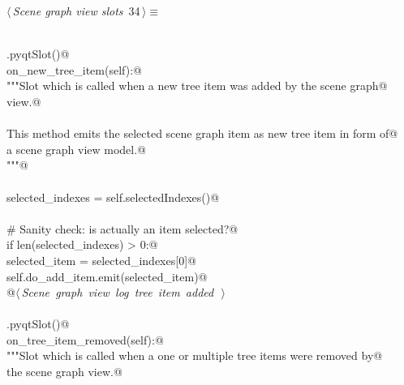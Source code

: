 \documentclass[
    a4paper,      %
    10pt,         %
    openright,    %
    notitlepage,  %
    parskip=half, %
]{scrreprt}       %
\theoremstyle{definition}                    %
\begin{document}
\begin{flushleft} \small
\begin{minipage}{\linewidth}\label{scrap40}\raggedright\small
{} $\langle\,${\itshape Scene graph view slots}\nobreak\ {\footnotesize {34}}$\,\rangle\equiv$
\vspace{-1exm}
\begin{list}{}{} \item
\mbox{}\lstinline@@\\
\mbox{}\lstinline@QtCore.pyqtSlot()@\\
\mbox{}\lstinline@def on_new_tree_item(self):@\\
\mbox{}\lstinline@    """Slot which is called when a new tree item was added by the scene graph@\\
\mbox{}\lstinline@    view.@\\
\mbox{}\lstinline@@\\
\mbox{}\lstinline@    This method emits the selected scene graph item as new tree item in form of@\\
\mbox{}\lstinline@    a scene graph view model.@\\
\mbox{}\lstinline@    """@\\
\mbox{}\lstinline@@\\
\mbox{}\lstinline@    selected_indexes = self.selectedIndexes()@\\
\mbox{}\lstinline@@\\
\mbox{}\lstinline@    # Sanity check: is actually an item selected?@\\
\mbox{}\lstinline@    if len(selected_indexes) > 0:@\\
\mbox{}\lstinline@        selected_item = selected_indexes[0]@\\
\mbox{}\lstinline@        self.do_add_item.emit(selected_item)@\\
\mbox{}\lstinline@        @\hbox{$\langle\,${\itshape Scene graph view log tree item added}\nobreak\ {\footnotesize {}}$\,\rangle$}\lstinline@@\\
\mbox{}\lstinline@@\\
\mbox{}\lstinline@QtCore.pyqtSlot()@\\
\mbox{}\lstinline@def on_tree_item_removed(self):@\\
\mbox{}\lstinline@    """Slot which is called when a one or multiple tree items were removed by@\\
\mbox{}\lstinline@    the scene graph view.@\\

\end{list}
\end{minipage}
\end{flushleft}
\end{document}
